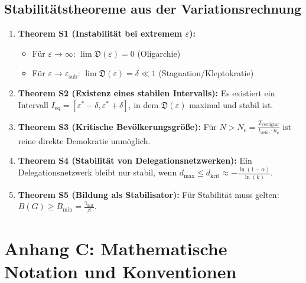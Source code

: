 \subsection*{Stabilitätstheoreme aus der Variationsrechnung}

\begin{enumerate}
    \item \textbf{Theorem S1 (Instabilität bei extremem $\varepsilon$):} 
        \begin{itemize}
            \item Für $\varepsilon \to \infty$: $\lim \mathfrak{D}(\varepsilon) = 0$ (Oligarchie)
            \item Für $\varepsilon \to \varepsilon_{\text{sub}}$: $\lim \mathfrak{D}(\varepsilon) = \delta \ll 1$ (Stagnation/Kleptokratie)
        \end{itemize}
    
    \item \textbf{Theorem S2 (Existenz eines stabilen Intervalls):} Es existiert ein Intervall $I_{\text{eq}} = [\varepsilon^* - \delta, \varepsilon^* + \delta]$, in dem $\mathfrak{D}(\varepsilon)$ maximal und stabil ist.
    
    \item \textbf{Theorem S3 (Kritische Bevölkerungsgröße):} Für $N > N_c = \frac{T_{\text{verfügbar}}}{t_{\text{delib}} \cdot n_q}$ ist reine direkte Demokratie unmöglich.
    
    \item \textbf{Theorem S4 (Stabilität von Delegationsnetzwerken):} Ein Delegationsnetzwerk bleibt nur stabil, wenn $d_{\text{max}} \leq d_{\text{krit}} \approx -\frac{\ln(1 - \alpha)}{\ln(k)}$.
    
    \item \textbf{Theorem S5 (Bildung als Stabilisator):} Für Stabilität muss gelten: $B(G) \geq B_{\min} = \frac{\gamma_{\text{nat}}}{\beta}$.
\end{enumerate}

\section*{Anhang C: Mathematische Notation und Konventionen}
\label{anhang:notation}

